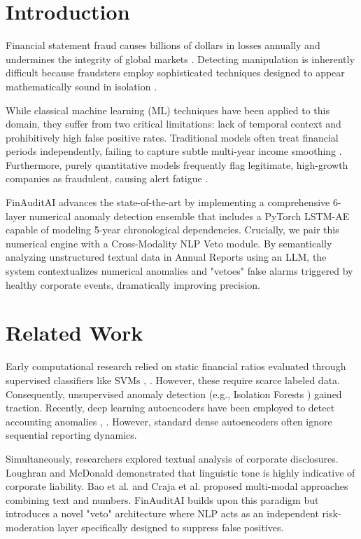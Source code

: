 \documentclass[conference]{IEEEtran}
\begin{document}
\section{Introduction}
Financial statement fraud causes billions of dollars in losses annually and undermines the integrity of global markets \cite{12}. Detecting manipulation is inherently difficult because fraudsters employ sophisticated techniques designed to appear mathematically sound in isolation \cite{4}.

While classical machine learning (ML) techniques have been applied to this domain, they suffer from two critical limitations: lack of temporal context and prohibitively high false positive rates. Traditional models often treat financial periods independently, failing to capture subtle multi-year income smoothing \cite{16}. Furthermore, purely quantitative models frequently flag legitimate, high-growth companies as fraudulent, causing alert fatigue \cite{11}. 

FinAuditAI advances the state-of-the-art by implementing a comprehensive 6-layer numerical anomaly detection ensemble that includes a PyTorch LSTM-AE capable of modeling 5-year chronological dependencies. Crucially, we pair this numerical engine with a Cross-Modality NLP Veto module. By semantically analyzing unstructured textual data in Annual Reports using an LLM, the system contextualizes numerical anomalies and "vetoes" false alarms triggered by healthy corporate events, dramatically improving precision.

\section{Related Work}
Early computational research relied on static financial ratios evaluated through supervised classifiers like SVMs \cite{11}, \cite{16}. However, these require scarce labeled data. Consequently, unsupervised anomaly detection (e.g., Isolation Forests \cite{7}) gained traction. Recently, deep learning autoencoders have been employed to detect accounting anomalies \cite{3}, \cite{15}. However, standard dense autoencoders often ignore sequential reporting dynamics. 

Simultaneously, researchers explored textual analysis of corporate disclosures. Loughran and McDonald \cite{1} demonstrated that linguistic tone is highly indicative of corporate liability. Bao et al. \cite{5} and Craja et al. \cite{2} proposed multi-modal approaches combining text and numbers. FinAuditAI builds upon this paradigm but introduces a novel "veto" architecture where NLP acts as an independent risk-moderation layer specifically designed to suppress false positives.
\end{document}
